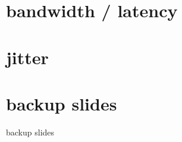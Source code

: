 \date{}
\title{}
\date{}

\begin{frame}
    \titlepage
\end{frame}

\section{bandwidth / latency}


\section{jitter}


\section{backup slides}
\begin{frame}{backup slides}
\end{frame}


